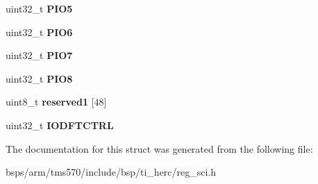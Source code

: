 \begin{DoxyCompactItemize}
uint32\+\_\+t {\bfseries P\+I\+O5}
\item 
\mbox{\label{structtms570__sci__t_acf4702525ed4259b513dc44b1af67c10}} 
uint32\+\_\+t {\bfseries P\+I\+O6}
\item 
\mbox{\label{structtms570__sci__t_a32e8630ad3513436cef760526a4dcaf7}} 
uint32\+\_\+t {\bfseries P\+I\+O7}
\item 
\mbox{\label{structtms570__sci__t_a54120503257c24e66fa102269a66272d}} 
uint32\+\_\+t {\bfseries P\+I\+O8}
\item 
\mbox{\label{structtms570__sci__t_a6b4add6fb9b96862f967dd1b6014812c}} 
uint8\+\_\+t {\bfseries reserved1} \mbox{[}48\mbox{]}
\item 
\mbox{\label{structtms570__sci__t_abe8c00f253c5210a55fe4cdef54d8555}} 
uint32\+\_\+t {\bfseries I\+O\+D\+F\+T\+C\+T\+RL}
\end{DoxyCompactItemize}


The documentation for this struct was generated from the following file\+:\begin{DoxyCompactItemize}
\item 
bsps/arm/tms570/include/bsp/ti\+\_\+herc/reg\+\_\+sci.\+h\end{DoxyCompactItemize}
